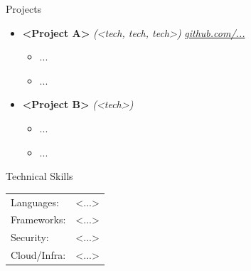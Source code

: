 \documentclass{resume}
\begin{document}
\begin{rSection}{Projects}
\begin{itemize}\itemsep -2pt

\item \textbf{<Project A>} \textit{(<tech, tech, tech>)} \hfill \href{<public repo url>}{\textit{github.com/...}}
\begin{itemize}\itemsep -2pt
  \item ...
  \item ...
\end{itemize}

\item \textbf{<Project B>} \textit{(<tech>)}
\begin{itemize}\itemsep -2pt
  \item ...
  \item ...
\end{itemize}

\end{itemize}
\end{rSection}

\begin{rSection}{Technical Skills}
\begin{tabular}{@{} l l @{}}
Languages: & <...> \\        %
Frameworks: & <...> \\
Security: & <...> \\
Cloud/Infra: & <...> \\
\end{tabular}
\end{rSection}
\end{document}
